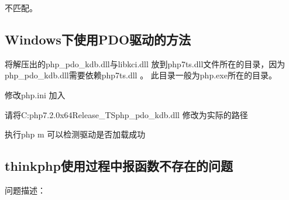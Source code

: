 \documentclass[letterpaper,10pt,english]{sphinxmanual}
\begin{document}
不匹配。

\begin{sphinxVerbatim}[commandchars=\\\{\}]
     
     
     
     
     
     
\end{sphinxVerbatim}


\subsection{Windows下使用PDO驱动的方法}
\label{\detokenize{interface/pdo:windowspdo}}
将解压出的php\_pdo\_kdb.dll与libkci.dll 放到php7ts.dll文件所在的目录，因为php\_pdo\_kdb.dll需要依赖php7ts.dll 。  此目录一般为php.exe所在的目录。

\begin{figure}[htbp]
\centering

\noindent{}
\end{figure}

修改php.ini  加入

\begin{sphinxVerbatim}[commandchars=\\\{\}]
\PYGZbs{}\PYGZbs{}\PYGZbs{}\PYGZbs{}
\end{sphinxVerbatim}

请将C:php\sphinxhyphen{}7.2.0x64Release\_TSphp\_pdo\_kdb.dll 修改为实际的路径

执行php \sphinxhyphen{}m 可以检测驱动是否加载成功

\begin{figure}[htbp]
\centering

\noindent{}
\end{figure}


\subsection{thinkphp使用过程中报函数不存在的问题}
\label{\detokenize{interface/pdo:thinkphp}}
问题描述：
\end{document}
